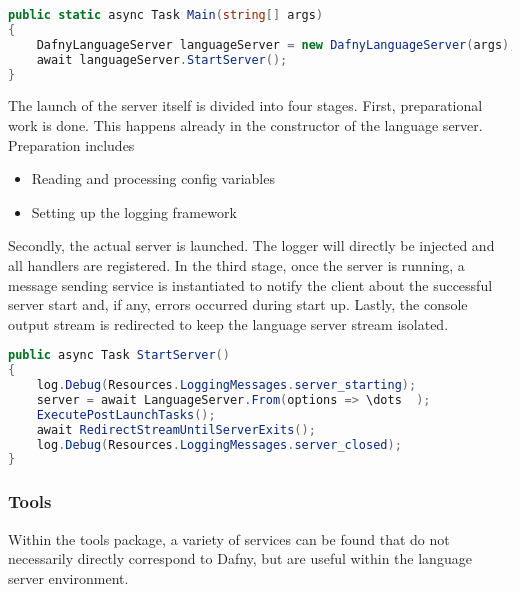 \begin{lstlisting}[language=csharp, caption={Main Function}, captionpos=b, label={lst:main}]
public static async Task Main(string[] args)
{
    DafnyLanguageServer languageServer = new DafnyLanguageServer(args);
    await languageServer.StartServer();
}
\end{lstlisting}

The launch of the server itself is divided into four stages.
First, preparational work is done.
This happens already in the constructor of the language server.
Preparation includes
\begin{itemize}
    \item Reading and processing config variables
    \item Setting up the logging framework
\end{itemize}
Secondly, the actual server is launched.
The logger will directly be injected and all handlers are registered.
In the third stage, once the server is running, a message sending service is instantiated to notify the client about the successful server start and, if any, errors occurred during start up.
Lastly, the console output stream is redirected to keep the language server stream isolated.

\begin{lstlisting}[language=csharp, caption={Starting the Language Server}, captionpos=b, label={lst:serverstart}]
public async Task StartServer()
{
    log.Debug(Resources.LoggingMessages.server_starting);
    server = await LanguageServer.From(options => \dots  );
    ExecutePostLaunchTasks();
    await RedirectStreamUntilServerExits();
    log.Debug(Resources.LoggingMessages.server_closed);
}
\end{lstlisting}

\subsubsection{Tools}
Within the tools package,
a variety of services can be found that do not necessarily directly correspond to Dafny,
but are useful within the language server environment.\\

